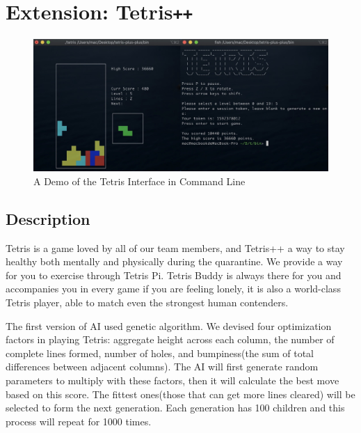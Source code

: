 \documentclass[11pt]{article}
\begin{document}

\section{Extension: Tetris\texttt{++}}

\begin{figure}[!ht]
  \centering
  \includegraphics[scale = 0.25]{tetris.jpg}
    \caption{A Demo of the Tetris Interface in Command Line}
  \label{part2:jpg}
\end{figure}



\subsection{Description}

\begin{flushleft}
Tetris is a game loved by all of our team members, and Tetris++ a way to stay healthy both mentally and physically during the quarantine. We provide a way for you to exercise through Tetris Pi. Tetris Buddy is always there for you and accompanies you in every game if you are feeling lonely, it is also a world-class Tetris player, able to match even the strongest human contenders.
\end{flushleft}

\begin{flushleft}
The first version of AI used genetic algorithm. We devised four optimization factors in playing Tetris: aggregate height across each column, the number of complete lines formed, number of holes, and bumpiness(the sum of total differences between adjacent columns). The AI will first generate random parameters to multiply with these factors, then it will calculate the best move based on this score. The fittest ones(those that can get more lines cleared) will be selected to form the next generation. Each generation has 100 children and this process will repeat for 1000 times.
\end{flushleft}
\end{document}
